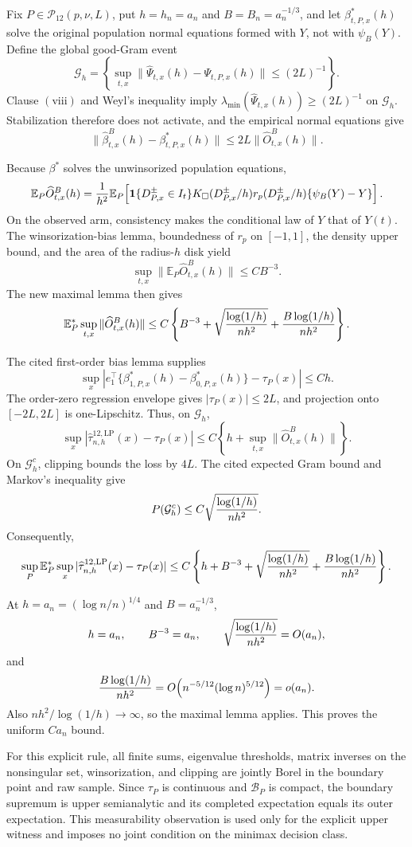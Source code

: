 Fix \(P\in\mathcal P_{12}(p,\nu,L)\), put \(h=h_n=a_n\) and \(B=B_n=a_n^{-1/3}\), and let \(\beta^*_{t,P,x}(h)\) solve the original population normal equations formed with \(Y\), not with \(\psi_B(Y)\).  Define the global good-Gram event
\[
 \mathcal G_h=\left\{
 \sup_{t,x}\|\widehat\Psi_{t,x}(h)-\Psi_{t,P,x}(h)\|
 \leq(2L)^{-1}\right\}.
\]
Clause \(\mathrm{(viii)}\) and Weyl's inequality imply \(\lambda_{\min}(\widehat\Psi_{t,x}(h))\geq(2L)^{-1}\) on \(\mathcal G_h\).  Stabilization therefore does not activate, and the empirical normal equations give
\[
 \|\widehat\beta^B_{t,x}(h)-\beta^*_{t,P,x}(h)\|
 \leq2L\|\widehat O^B_{t,x}(h)\|.
\]

Because \(\beta^*\) solves the unwinsorized population equations,
\[
 \mathbb E_P\widehat O^B_{t,x}(h)
 ={1\over h^2}\mathbb E_P\!\left[
 \mathbf1\{D^{\pm}_{P,x}\in I_t\}K_\square(D^{\pm}_{P,x}/h)
 r_p(D^{\pm}_{P,x}/h)\{\psi_B(Y)-Y\}\right].
\]
On the observed arm, consistency makes the conditional law of \(Y\) that of \(Y(t)\).  The winsorization-bias lemma, boundedness of \(r_p\) on \([-1,1]\), the density upper bound, and the area of the radius-\(h\) disk yield
\[
 \sup_{t,x}\|\mathbb E_P\widehat O^B_{t,x}(h)\|
 \leq CB^{-3}.
\]
The new maximal lemma then gives
\[
 \mathbb E_P^*\sup_{t,x}\|\widehat O^B_{t,x}(h)\|
 \leq C\left\{B^{-3}+\sqrt{{\log(1/h)\over nh^2}}
 +{B\log(1/h)\over nh^2}\right\}.
\]

The cited first-order bias lemma supplies
\[
 \sup_x\left|e_1^\top\{\beta^*_{1,P,x}(h)-\beta^*_{0,P,x}(h)\}-\tau_P(x)\right|
 \leq Ch.
\]
The order-zero regression envelope gives \(|\tau_P(x)|\leq2L\), and projection onto \([-2L,2L]\) is one-Lipschitz.  Thus, on \(\mathcal G_h\),
\[
 \sup_x|\widehat\tau^{12,\mathrm{LP}}_{n,h}(x)-\tau_P(x)|
 \leq C\left\{h+\sup_{t,x}\|\widehat O^B_{t,x}(h)\|\right\}.
\]
On \(\mathcal G_h^c\), clipping bounds the loss by \(4L\).  The cited expected Gram bound and Markov's inequality give
\[
 P(\mathcal G_h^c)
 \leq C\sqrt{{\log(1/h)\over nh^2}}.
\]
Consequently,
\[
 \sup_P\mathbb E_P^*\sup_x|\widehat\tau^{12,\mathrm{LP}}_{n,h}(x)-\tau_P(x)|
 \leq C\left\{h+B^{-3}+\sqrt{{\log(1/h)\over nh^2}}
 +{B\log(1/h)\over nh^2}\right\}.
\]

At \(h=a_n=(\log n/n)^{1/4}\) and \(B=a_n^{-1/3}\),
\[
 h=a_n,
 \qquad B^{-3}=a_n,
 \qquad \sqrt{{\log(1/h)\over nh^2}}=O(a_n),
\]
and
\[
 {B\log(1/h)\over nh^2}
 =O\!\left(n^{-5/12}(\log n)^{5/12}\right)=o(a_n).
\]
Also \(nh^2/\log(1/h)\to\infty\), so the maximal lemma applies.  This proves the uniform \(Ca_n\) bound.

For this explicit rule, all finite sums, eigenvalue thresholds, matrix inverses on the nonsingular set, winsorization, and clipping are jointly Borel in the boundary point and raw sample.  Since \(\tau_P\) is continuous and \(\mathcal B_P\) is compact, the boundary supremum is upper semianalytic and its completed expectation equals its outer expectation.  This measurability observation is used only for the explicit upper witness and imposes no joint condition on the minimax decision class.